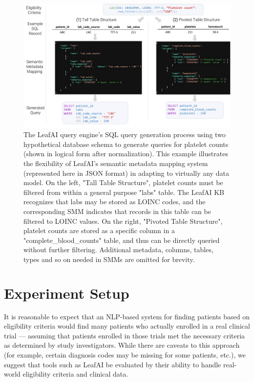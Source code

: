 \documentclass[../main.tex]{subfiles}
\begin{document}
\begin{figure}[h!]
  \includegraphics[scale=0.47]{Figures/7_query_generation/leafai_smm.pdf}  
\caption{The LeafAI query engine's SQL query generation process using two hypothetical database schema to generate queries for platelet counts (shown in logical form after normalization). This example illustrates the flexibility of LeafAI's semantic metadata mapping system (represented here in JSON format) in adapting to virtually any data model. On the left, "Tall Table Structure", platelet counts must be filtered from within a general purpose "labs" table. The LeafAI KB recognizes that labs may be stored as LOINC codes, and the corresponding SMM indicates that records in this table can be filtered to LOINC values. On the right, "Pivoted Table Structure", platelet counts are stored as a specific column in a "complete\_blood\_counts" table, and thus can be directly queried without further filtering. Additional metadata, columns, tables, types and so on needed in SMMs are omitted for brevity.}
\label{fig_leafai_smm}
\end{figure}

\section{Experiment Setup}

It is reasonable to expect that an NLP-based system for finding patients based on eligibility criteria would find many  patients who actually enrolled in a real clinical trial — assuming  that patients enrolled in those trials met the necessary criteria as determined by study investigators. While there are caveats to this approach (for example, certain diagnosis codes may be missing for some patients, etc.), we suggest that tools such as LeafAI be evaluated by their ability to handle real-world eligibility criteria and clinical data. 
\end{document}
